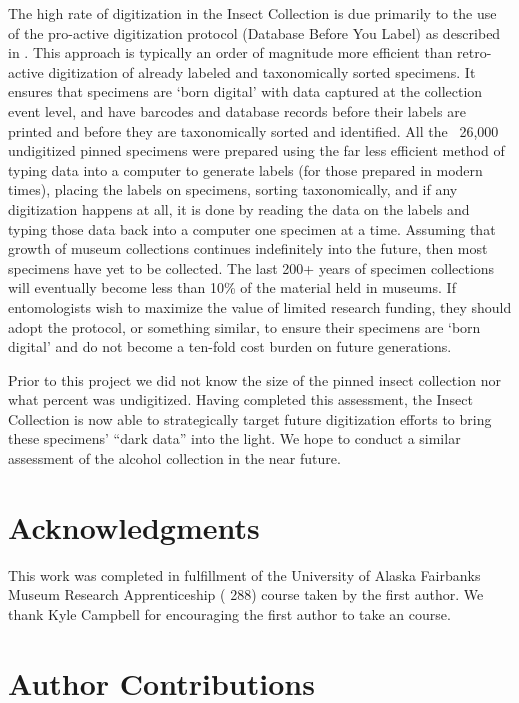 \begin{multicols}{2}
The high rate of digitization in the  Insect Collection is due primarily to the use of the pro-active  digitization protocol (Database Before You Label) as described in \citet{Sikesetal2017}. This approach is typically an order of magnitude more efficient than retro-active digitization of already labeled and taxonomically sorted specimens. It ensures that specimens are ‘born digital’ with data captured at the collection event level, and have barcodes and database records before their labels are printed and before they are taxonomically sorted and identified. All the ~26,000 undigitized pinned specimens were prepared using the far less efficient method of typing data into a computer to generate labels (for those prepared in modern times), placing the labels on specimens, sorting taxonomically, and if any digitization happens at all, it is done by reading the data on the labels and typing those data back into a computer one specimen at a time. Assuming that growth of museum collections continues indefinitely into the future, then most specimens have yet to be collected. The last 200+ years of specimen collections will eventually become less than 10\% of the material held in museums. If entomologists wish to maximize the value of limited research funding, they should adopt the  protocol, or something similar, to ensure their specimens are ‘born digital’ and do not become a ten-fold cost burden on future generations.

Prior to this project we did not know the size of the pinned insect collection nor what percent was undigitized. Having completed this assessment, the  Insect Collection is now able to strategically target future digitization efforts to bring these specimens’ “dark data” into the light. We hope to conduct a similar assessment of the alcohol collection in the near future.

\section{Acknowledgments}

This work was completed in fulfillment of the University of Alaska Fairbanks Museum Research Apprenticeship ( 288) course taken by the first author. We thank Kyle Campbell for encouraging the first author to take an  course.
 
\section{Author Contributions}
 

\end{multicols}

